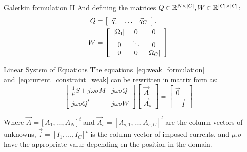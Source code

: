 \documentclass[aspectratio=54,xcolor=dvipsnames]{beamer}
\begin{document}
\begin{frame}{Galerkin formulation II}
    And defining the matrices $Q \in \mathbb{R}^{N \times \abs{C}}, W \in \mathbb{R}^{\abs{C} \times \abs{C}}$:
    \begin{align*}
        Q &= \left[
        \begin{array}{ccc}
            \vec{q}_1 & \ldots & \vec{q}_C
        \end{array}
        \right], \\
        W &= \left[
        \begin{array}{ccc}
            \abs{\Omega_1} & 0 & 0 \\
            0 & \ddots & 0 \\
            0 & 0 & \abs{\Omega_C}
        \end{array}
        \right]
    \end{align*}

    \begin{block}{Linear System of Equations}
    The equations~\eqref{eq:weak_formulation} and~\eqref{eq:current_constraint_weak} can be rewritten in matrix form as:
    \begin{equation}
        \left[
        \begin{array}{cc}
            \frac{1}{\mu} S + j\omega \sigma M & j\omega \sigma Q\\
            j\omega \sigma Q^t & j\omega \sigma W 
        \end{array}
        \right]
        \left[
        \begin{array}{c}
            \vec{A} \\
            \vec{A}_{s}
        \end{array}
        \right]
        =
        \left[
        \begin{array}{c}
            \vec{0} \\
            -\vec{I} 
        \end{array}
        \right]
    \end{equation}
    \end{block}
    Where $\vec{A} = [A_1, \ldots, A_N]^t$ and $\vec{A}_s = [A_{s,1}, \ldots, A_{s,C}]^t$ are the column vectors of unknowns, $\vec{I} = [I_1, \ldots, I_C]^t$ is the column vector of imposed currents, and $\mu$,$\sigma$ have the appropriate value depending on the position in the domain.
\end{frame}
\end{document}
